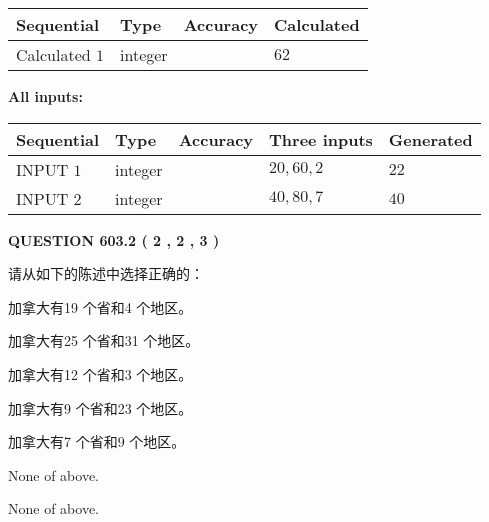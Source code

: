 \documentclass{ctexart}
\begin{document}
  
\noindent\begin{tabular}{|l|l|l|l|}
\hline
 Sequential & Type & Accuracy & Calculated \\ 
\hline
 
 
  Calculated $  1 $ & integer &  & 
  $ 62 $ 
 \\  \hline  
 \end{tabular}
   
   
   
   
\noindent\vspace{0.1in}\hspace{-0.08in} {\textbf{\Large{All inputs: }}}
   
   
  
  
\noindent\begin{tabular}{|l|l|l|l|l|}
\hline
 Sequential & Type & Accuracy & Three inputs & Generated \\ 
\hline
 
 
  INPUT $  1 $ & integer &  & $
 20
 , 
 60
 , 
 2
 $ & $ 22 $ 
 \\  \hline  
 
 
  INPUT $  2 $ & integer &  & $
 40
 , 
 80
 , 
 7
 $ & $ 40 $ 
 \\  \hline  
 \end{tabular}
   
   
  
\vspace{0.2in}
  
{\textbf{\Large{QUESTION
603.2 
 ( 2 , 2 , 3 )
}}}
  
  
请从如下的陈述中选择正确的：
 
 
加拿大有19 个省和4 个地区。
 
 
加拿大有25 个省和31 个地区。
 
 
加拿大有12 个省和3 个地区。
 
 
加拿大有9 个省和23 个地区。
 
 
加拿大有7 个省和9 个地区。
 
 
 None of above.
 
 
\noindent{}
 
 
 None of above.
 
 
\noindent{}
 
\end{document}
